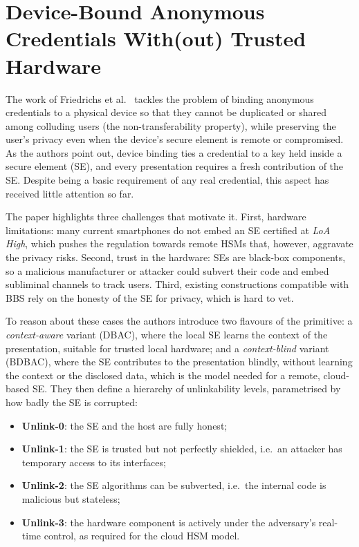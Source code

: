 \documentclass[binding=0.6cm,oneside,noexaminfo]{sapthesis}
\begin{document}
\section{Device-Bound Anonymous Credentials With(out) Trusted Hardware}
\label{devboundancred}
The work of Friedrichs et al.~\cite{Friedrichs2025DeviceBound} tackles the problem of binding anonymous credentials
to a physical device so that they cannot be duplicated or shared among colluding users (the non-transferability
property), while preserving the user's privacy even when the device's secure element is remote or compromised. As the
authors point out, device binding ties a credential to a key held inside a secure element (SE), and every presentation
requires a fresh contribution of the SE. Despite being a basic requirement of any real credential, this aspect has
received little attention so far.

The paper highlights three challenges that motivate it. First, hardware limitations: many current smartphones do not
embed an SE certified at \emph{LoA High}, which pushes the regulation towards remote HSMs that, however, aggravate the
privacy risks. Second, trust in the hardware: SEs are black-box components, so a malicious manufacturer or attacker
could subvert their code and embed subliminal channels to track users. Third, existing constructions compatible with
BBS rely on the honesty of the SE for privacy, which is hard to vet.

To reason about these cases the authors introduce two flavours of the primitive: a \emph{context-aware} variant (DBAC),
where the local SE learns the context of the presentation, suitable for trusted local hardware; and a
\emph{context-blind} variant (BDBAC), where the SE contributes to the presentation blindly, without learning the
context or the disclosed data, which is the model needed for a remote, cloud-based SE. They then define a hierarchy of
unlinkability levels, parametrised by how badly the SE is corrupted:
\begin{itemize}[noitemsep]
  \item \textbf{Unlink-0}: the SE and the host are fully honest;
  \item \textbf{Unlink-1}: the SE is trusted but not perfectly shielded, i.e.\ an attacker has temporary access to its interfaces;
  \item \textbf{Unlink-2}: the SE algorithms can be subverted, i.e.\ the internal code is malicious but stateless;
  \item \textbf{Unlink-3}: the hardware component is actively under the adversary's real-time control, as required for the cloud HSM model.
\end{itemize}
\end{document}
